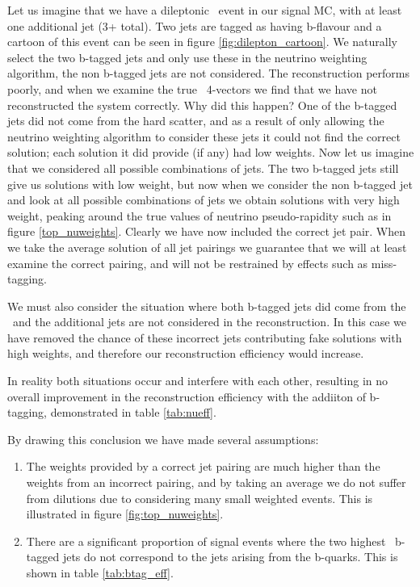 Let us imagine that we have a dileptonic \ttbar\ event in our signal MC, with at least one additional jet (3+ total). Two jets are tagged as having b-flavour and a cartoon of this event can be seen in figure \ref{fig:dilepton_cartoon}. We naturally select the two b-tagged jets and only use these in the neutrino weighting algorithm, the non b-tagged jets are not considered. The reconstruction performs poorly, and when we examine the true \ttbar\ 4-vectors we find that we have not reconstructed the system correctly. Why did this happen? One of the b-tagged jets did not come from the hard scatter, and as a result of only allowing the neutrino weighting algorithm to consider these jets it could not find the correct solution; each solution it did provide (if any) had low weights. Now let us imagine that we considered all possible combinations of jets. The two b-tagged jets still give us solutions with low weight, but now when we consider the non b-tagged jet and look at all possible combinations of jets we obtain solutions with very high weight, peaking around the true values of neutrino pseudo-rapidity such as in figure \ref{top_nuweights}. Clearly we have now included the correct jet pair. When we take the average solution of all jet pairings we guarantee that we will at least examine the correct pairing, and will not be restrained by effects such as miss-tagging.

We must also consider the situation where both b-tagged jets did come from the \ttbar\ and the additional jets are not considered in the reconstruction. In this case we have removed the chance of these incorrect jets contributing fake solutions with high weights, and therefore our reconstruction efficiency would increase.

In reality both situations occur and interfere with each other, resulting in no overall improvement in the reconstruction efficiency with the addiiton of b-tagging, demonstrated in table \ref{tab:nueff}.

By drawing this conclusion we have made several assumptions:

\begin{enumerate}
\item The weights provided by a correct jet pairing are much higher than the weights from an incorrect pairing, and by taking an average we do not suffer from dilutions due to considering many small weighted events. This is illustrated in figure \ref{fig:top_nuweights}.
\item There are a significant proportion of signal events where the two highest \pt\ b-tagged jets do not correspond to the jets arising from the b-quarks. This is shown in table \ref{tab:btag_eff}.
\end{enumerate}

